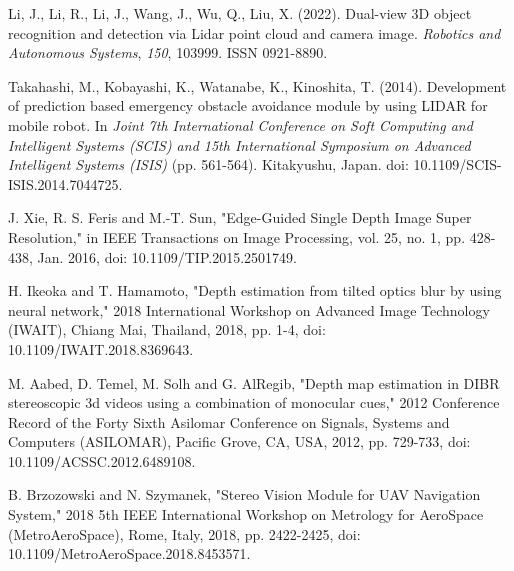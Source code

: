 \begin{flushleft}

\begin{thebibliography}{19}

    

 Li, J., Li, R., Li, J., Wang, J., Wu, Q., Liu, X. (2022). Dual-view 3D object recognition and detection via Lidar point cloud and camera image. \textit{Robotics and Autonomous Systems}, \textit{150}, 103999. ISSN 0921-8890.

 Takahashi, M., Kobayashi, K., Watanabe, K., Kinoshita, T. (2014). Development of prediction based emergency obstacle avoidance module by using LIDAR for mobile robot. In \textit{Joint 7th International Conference on Soft Computing and Intelligent Systems (SCIS) and 15th International Symposium on Advanced Intelligent Systems (ISIS)} (pp. 561-564). Kitakyushu, Japan. doi: 10.1109/SCIS-ISIS.2014.7044725.


J. Xie, R. S. Feris and M.-T. Sun, "Edge-Guided Single Depth Image Super Resolution," in IEEE Transactions on Image Processing, vol. 25, no. 1, pp. 428-438, Jan. 2016, doi: 10.1109/TIP.2015.2501749.

H. Ikeoka and T. Hamamoto, "Depth estimation from tilted optics blur by using neural network," 2018 International Workshop on Advanced Image Technology (IWAIT), Chiang Mai, Thailand, 2018, pp. 1-4, doi: 10.1109/IWAIT.2018.8369643.

M. Aabed, D. Temel, M. Solh and G. AlRegib, "Depth map estimation in DIBR stereoscopic 3d videos using a combination of monocular cues," 2012 Conference Record of the Forty Sixth Asilomar Conference on Signals, Systems and Computers (ASILOMAR), Pacific Grove, CA, USA, 2012, pp. 729-733, doi: 10.1109/ACSSC.2012.6489108.


B. Brzozowski and N. Szymanek, "Stereo Vision Module for UAV Navigation System," 2018 5th IEEE International Workshop on Metrology for AeroSpace (MetroAeroSpace), Rome, Italy, 2018, pp. 2422-2425, doi: 10.1109/MetroAeroSpace.2018.8453571.


\end{thebibliography}
\end{flushleft}
